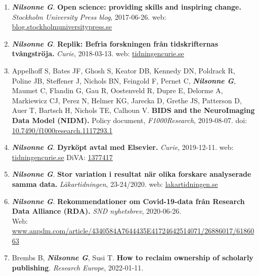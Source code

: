 \documentclass[10pt]{article}
\begin{document}
\begin{enumerate}[nolistsep]
web: \href{https://universitetslararen.se/2017/06/01/oppen-tillgang-ger-forfattare-starkare-stallning/}{universitetslararen.se}
\item \textbf{\textit{Nilsonne G}}. \textbf{Open science: providing skills and inspiring change.} \emph{Stockholm University Press blog}, 2017-06-26.
web: \href{https://blog.stockholmuniversitypress.se/2017/06/26/open-science-providing-skills-and-inspiring-change/}{blog.stockholmuniversitypress.se}
\item \textbf{\textit{Nilsonne G}}. \textbf{Replik: Befria forskningen från tidskrifternas tvångströja.} \emph{Curie}, 2018-03-13.
web: \href{https://www.tidningencurie.se/debatt/replik-befria-forskningen-fran-tidskriftspubliceringens-tvangstroja/}{tidningencurie.se}
\item Appelhoff S, Bates JF, Ghosh S, Keator DB, Kennedy DN, Poldrack R, Poline JB, Steffener J, Nichols BN, Feingold F, Pernet C, \textbf{\textit{Nilsonne G}}, Maumet C, Flandin G, Gau R, Oostenveld R, Dupre E, Delorme A, Markiewicz CJ, Perez N, Helmer KG, Jarecka D, Grethe JS, Patterson D, Auer T, Bartsch H, Nichols TE, Calhoun V. \textbf{BIDS and the NeuroImaging Data Model (NIDM).} Policy document,  \emph{F1000Research}, 2019-08-07. doi: \href{https://doi.org/10.7490/f1000research.1117293.1}{10.7490/f1000research.1117293.1}
\item \textbf{\textit{Nilsonne G}}. \textbf{Dyrköpt avtal med Elsevier.} \emph{Curie}, 2019-12-11.
web: \href{https://www.tidningencurie.se/debatt/dyrkopt-avtal-med-elsevier/}{tidningencurie.se} DiVA: \href{http://www.diva-portal.org/smash/record.jsf?pid=diva2\%3A1377417}{1377417}
\item \textbf{\textit{Nilsonne G}}. \textbf{Stor variation i resultat när olika forskare analyserade samma data.} \emph{Läkartidningen}, 23-24/2020. web: \href{https://lakartidningen.se/klinik-och-vetenskap-1/nya-ron/2020/06/stor-variation-i-resultat-nar-olika-forskare-analyserade-samma-data/}{lakartidningen.se}
\item \textbf{\textit{Nilsonne G}}. \textbf{Rekommendationer om Covid-19-data från Research Data Alliance (RDA).} \emph{SND nyhetsbrev}, 2020-06-26.\\
 Web: \href{https://www.anpdm.com/article/4340584A7644435E41724642514071/26886017/6186063}{www.anpdm.com/article/4340584A7644435E41724642514071/26886017/6186063}
\item Brembs B, \textbf{\textit{Nilsonne G}}, Susi T. \textbf{How to reclaim ownership of scholarly publishing}. \emph{Research Europe}, 2022-01-11. 

\end{enumerate}
\end{document}
